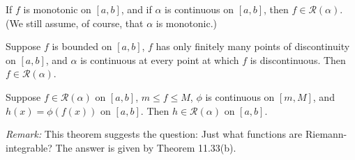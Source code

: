 \begin{thm}
    \label{thm:6.9}
    If $f$ is monotonic on $[a, b]$,
    and if $\alpha$ is continuous on $[a, b]$,
    then $f \in \mathscr{R}(\alpha)$.
    (We still assume, of course, that $\alpha$ is monotonic.)
\end{thm}

\begin{thm}
    \label{thm:6.10}
    Suppose $f$ is bounded on $[a, b]$, 
    $f$ has only finitely many points of discontinuity on $[a, b]$, 
    and $\alpha$ is continuous at every point 
    at which $f$ is discontinuous. 
    Then $f \in \mathscr{R}(\alpha)$.
\end{thm}

\begin{thm}
    \label{thm:6.11}
    Suppose $f \in \mathscr{R}(\alpha)$ on $[a, b]$, $m \leq f \leq M$, 
    $\phi$ is continuous on $[m, M]$, 
    and $h(x) = \phi(f(x))$ on $[a, b]$. 
    Then $h \in \mathscr{R}(\alpha)$ on $[a, b]$.
\end{thm}


\emph{Remark: } This theorem suggests the question: 
Just what functions are Riemann-integrable?
The answer is given by Theorem 11.33(b).